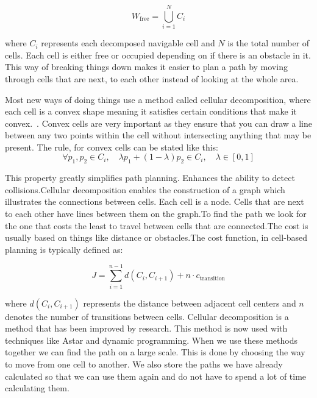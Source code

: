 \begin{equation}
W_{\text{free}} = \bigcup_{i=1}^{N} C_i
\end{equation}

where $C_i$ represents each decomposed navigable cell and $N$ is the total number of cells. Each cell is either free or occupied depending on if there is an obstacle in it. This way of breaking things down makes it easier to plan a path by moving through cells that are next, to each other instead of looking at the whole area.

Most new ways of doing things use a method called cellular decomposition, where each cell is a convex shape meaning it satisfies certain conditions that make it convex.~\cite{choset2001coverage}. Convex cells are very important as they ensure that you can draw a line between any two points within the cell without intersecting anything that may be present. The rule, for convex cells can be stated like this:
\begin{equation}
\forall p_1, p_2 \in C_i, \quad \lambda p_1 + (1-\lambda) p_2 \in C_i, \quad \lambda \in [0,1]
\end{equation}

This property greatly simplifies path planning. Enhances the ability to detect collisions.Cellular decomposition enables the construction of a graph which illustrates the connections between cells. Each cell is a node. Cells that are next to each other have lines between them on the graph.To find the path we look for the one that costs the least to travel between cells that are connected.The cost is usually based on things like distance or obstacles.The cost function, in cell-based planning is typically defined as:

\begin{equation}
J = \sum_{i=1}^{n-1} d(C_i, C_{i+1}) + n \cdot c_{\text{transition}}
\end{equation}

where $d(C_i, C_{i+1})$ represents the distance between adjacent cell centers and $n$ denotes the number of transitions between cells.
Cellular decomposition is a method that has been improved by research. This method is now used with techniques like Astar and dynamic programming. When we use these methods together we can find the path on a large scale. This is done by choosing the way to move from one cell to another. We also store the paths we have already calculated so that we can use them again and do not have to spend a lot of time calculating them.

